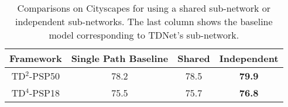 \documentclass[10pt,twocolumn,letterpaper]{article}
\begin{document}
\begin{table}[t]
\centering
{}
\vspace{0.05cm}
\caption{Effect of different downsampling stride $n$ on Cityscapes. 
}
\label{tab6}
\end{table}

\begin{table}[t]
\centering
\small
\begin{tabular}{ |c|c|c|c|} 
 \hline
 Framework &Single Path Baseline &Shared & Independent\\ 
 \hline 
 \hline 
 \footnotesize{TD$^2$-PSP50}   &78.2    &78.5 & \textbf{79.9}\\ 
 \footnotesize{TD$^4$-PSP18}   &75.5    &75.7 & \textbf{76.8}\\ 
 \hline
\end{tabular}
\vspace{0.1cm}
\caption{\small{Comparisons on Cityscapes for using a shared sub-network or independent sub-networks. The last column shows the baseline model corresponding to TDNet's sub-network.}}
\label{tab7}
\vspace{-0.6cm}
\end{table}
\end{document}

